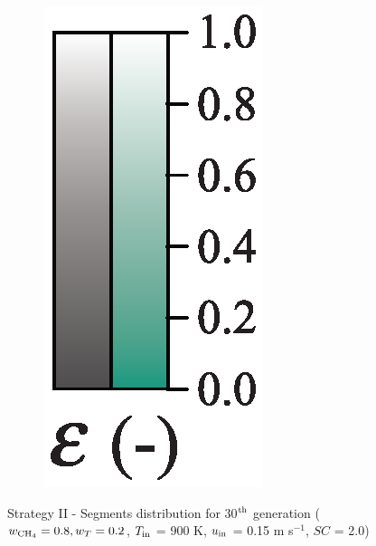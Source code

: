 \documentclass[preprint,12pt]{elsarticle}
\begin{document}
\begin{figure}
\begin{subfigure}[b]{0.1\textwidth}
     	\includegraphics[width=\textwidth]{segments_porosity.eps}
     \end{subfigure}
\caption{\label{fig:30L6040G1-TField} Strategy II - Segments distribution for 30$^{\rm{th}}$ generation ($w_{\rm{CH_4}} = 0.8, w_T = 0.2$, $T_{\rm{in}}$ = 900 K, $u_{\rm{in}}$ = 0.15 m s$^{-1}$, $SC$ = 2.0)}
\end{figure}
\end{document}
